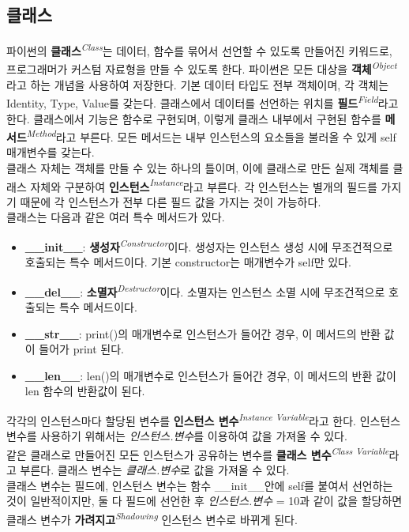 \subsection{클래스}

파이썬의 \textbf{클래스}\textit{\textsuperscript{Class}}는 데이터, 함수를 묶어서 선언할 수 있도록 만들어진 키워드로, 프로그래머가 커스텀 자료형을 만들 수 있도록 한다. 파이썬은 모든 대상을 \textbf{객체}\textit{\textsuperscript{Object}}라고 하는 개념을 사용하여 저장한다. 기본 데이터 타입도 전부 객체이며, 각 객체는 Identity, Type, Value를 갖는다. 클래스에서 데이터를 선언하는 위치를 \textbf{필드}\textit{\textsuperscript{Field}}라고 한다. 클래스에서 기능은 함수로 구현되며, 이렇게 클래스 내부에서 구현된 함수를 \textbf{메서드}\textit{\textsuperscript{Method}}라고 부른다. 모든 메서드는 내부 인스턴스의 요소들을 불러올 수 있게 self 매개변수를 갖는다.\\
클래스 자체는 객체를 만들 수 있는 하나의 틀이며, 이에 클래스로 만든 실제 객체를 클래스 자체와 구분하여 \textbf{인스턴스}\textit{\textsuperscript{Instance}}라고 부른다. 각 인스턴스는 별개의 필드를 가지기 때문에 각 인스턴스가 전부 다른 필드 값을 가지는 것이 가능하다.\\
클래스는 다음과 같은 여러 특수 메서드가 있다.
\begin{itemize}
\item \textbf{\_\_init\_\_}: \textbf{생성자}\textit{\textsuperscript{Constructor}}이다. 생성자는 인스턴스 생성 시에 무조건적으로 호출되는 특수 메서드이다. 기본 constructor는 매개변수가 self만 있다.
\item \textbf{\_\_del\_\_}: \textbf{소멸자}\textit{\textsuperscript{Destructor}}이다. 소멸자는 인스턴스 소멸 시에 무조건적으로 호출되는 특수 메서드이다.
\item \textbf{\_\_str\_\_}: print()의 매개변수로 인스턴스가 들어간 경우, 이 메서드의 반환 값이 들어가 print 된다.
\item \textbf{\_\_len\_\_}: len()의 매개변수로 인스턴스가 들어간 경우, 이 메서드의 반환 값이 len 함수의 반환값이 된다.
\end{itemize}

각각의 인스턴스마다 할당된 변수를 \textbf{인스턴스 변수}\textit{\textsuperscript{Instance Variable}}라고 한다. 인스턴스 변수를 사용하기 위해서는 \textit{인스턴스.변수}를 이용하여 값을 가져올 수 있다.\\
같은 클래스로 만들어진 모든 인스턴스가 공유하는 변수를 \textbf{클래스 변수}\textit{\textsuperscript{Class Variable}}라고 부른다. 클래스 변수는 \textit{클래스.변수}로 값을 가져올 수 있다.\\
클래스 변수는 필드에, 인스턴스 변수는 함수 \_\_init\_\_안에 self를 붙여서 선언하는 것이 일반적이지만, 둘 다 필드에 선언한 후 \textit{인스턴스.변수} = 10과 같이 값을 할당하면 클래스 변수가 \textbf{가려지고}\textit{\textsuperscript{Shadowing}} 인스턴스 변수로 바뀌게 된다.

